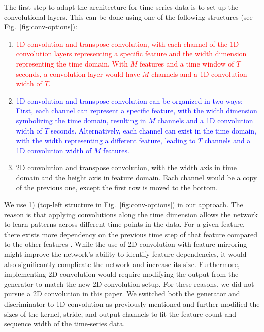 The first step to adapt the architecture for time-series data is to set up the convolutional layers. This can be done using one of the following structures (see Fig.~\ref{fig:conv-options}):
%
\begin{enumerate}
    \item \textcolor{red}{1D convolution and transpose convolution, with each channel of the 1D convolution layers representing a specific feature and the width dimension representing the time domain. With $M$ features and a time window of $T$ seconds, a convolution layer would have $M$ channels and a 1D convolution width of $T$.}
    \item \textcolor{blue}{1D convolution and transpose convolution can be organized in two ways: First, each channel can represent a specific feature, with the width dimension symbolizing the time domain, resulting in $M$ channels and a 1D convolution width of $T$ seconds. Alternatively, each channel can exist in the time domain, with the width representing a different feature, leading to $T$ channels and a 1D convolution width of $M$ features.}
    \item 2D convolution and transpose convolution, with the width axis in time domain and the height axis in feature domain. Each channel would be a copy of the previous one, except the first row is moved to the bottom.
\end{enumerate}
%
We use 1) (top-left structure in Fig.~\ref{fig:conv-options}) in our approach. The reason is that applying convolutions along the time dimension allows the network to learn patterns across different time points in the data. For a given feature, there exists more dependency on the previous time step of that feature compared to the other features \cite{Ismail_Fawaz_2019}.
%
While the use of 2D convolution with feature mirroring might improve the network's ability to identify feature dependencies, it would also significantly complicate the network and increase its size. Furthermore, implementing 2D convolution would require modifying the output from the generator to match the new 2D convolution setup. For these reasons, we did not pursue a 2D convolution in this paper.
%
We switched both the generator and discriminator to 1D convolution as previously mentioned and further modified the sizes of the kernel, stride, and output channels to fit the feature count and sequence width of the time-series data. 

